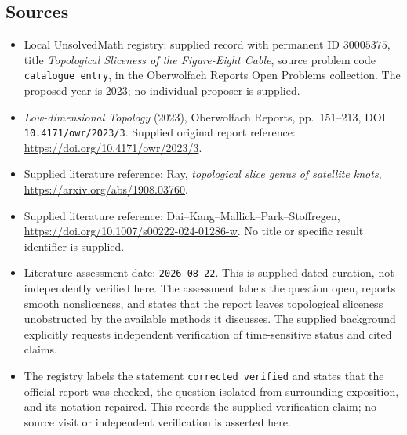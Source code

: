 \documentclass[11pt]{article}
\begin{document}
\subsection{Sources}
\begin{itemize}
\item Local UnsolvedMath registry: supplied record with permanent ID \(30005375\), title \emph{Topological Sliceness of the Figure-Eight Cable}, source problem code \texttt{catalogue entry}, in the Oberwolfach Reports Open Problems collection. The proposed year is 2023; no individual proposer is supplied.
\item \emph{Low-dimensional Topology} (2023), Oberwolfach Reports, pp.~151--213, DOI \texttt{10.4171/owr/2023/3}. Supplied original report reference: \url{https://doi.org/10.4171/owr/2023/3}.
\item Supplied literature reference: Ray, \emph{topological slice genus of satellite knots}, \url{https://arxiv.org/abs/1908.03760}.
\item Supplied literature reference: Dai--Kang--Mallick--Park--Stoffregen, \url{https://doi.org/10.1007/s00222-024-01286-w}. No title or specific result identifier is supplied.
\item Literature assessment date: \texttt{2026-08-22}. This is supplied dated curation, not independently verified here. The assessment labels the question open, reports smooth nonsliceness, and states that the report leaves topological sliceness unobstructed by the available methods it discusses. The supplied background explicitly requests independent verification of time-sensitive status and cited claims.
\item The registry labels the statement \texttt{corrected\_verified} and states that the official report was checked, the question isolated from surrounding exposition, and its notation repaired. This records the supplied verification claim; no source visit or independent verification is asserted here.
\end{itemize}
\end{document}

